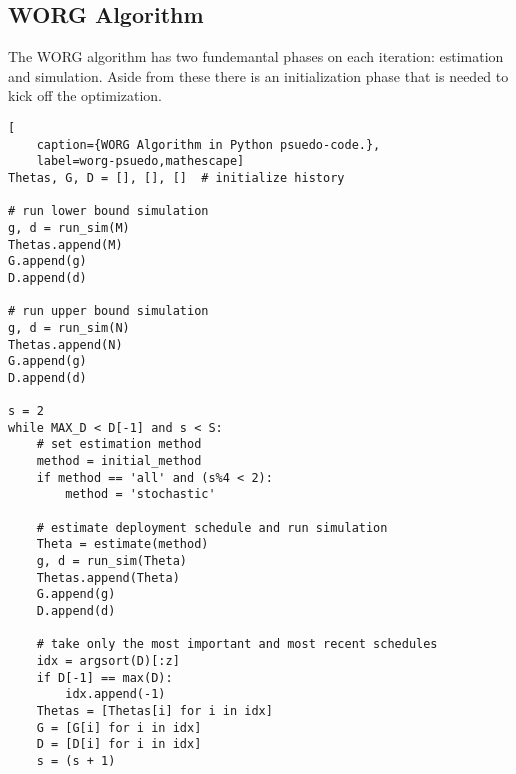\subsection{WORG Algorithm}
\label{algo}

The WORG algorithm has two fundemantal phases on each iteration:
estimation and simulation.  Aside from these there is an initialization 
phase that is needed to kick off the optimization.

\clearpage
\begin{lstlisting}[
    caption={WORG Algorithm in Python psuedo-code.},
    label=worg-psuedo,mathescape]
Thetas, G, D = [], [], []  # initialize history

# run lower bound simulation
g, d = run_sim(M)
Thetas.append(M)
G.append(g)
D.append(d)

# run upper bound simulation    
g, d = run_sim(N)
Thetas.append(N)
G.append(g)
D.append(d)

s = 2
while MAX_D < D[-1] and s < S:
    # set estimation method
    method = initial_method
    if method == 'all' and (s%4 < 2):
        method = 'stochastic'

    # estimate deployment schedule and run simulation
    Theta = estimate(method)
    g, d = run_sim(Theta)
    Thetas.append(Theta)
    G.append(g)
    D.append(d)

    # take only the most important and most recent schedules
    idx = argsort(D)[:z]
    if D[-1] == max(D):
        idx.append(-1)
    Thetas = [Thetas[i] for i in idx]
    G = [G[i] for i in idx]
    D = [D[i] for i in idx]
    s = (s + 1)
\end{lstlisting}
\clearpage
